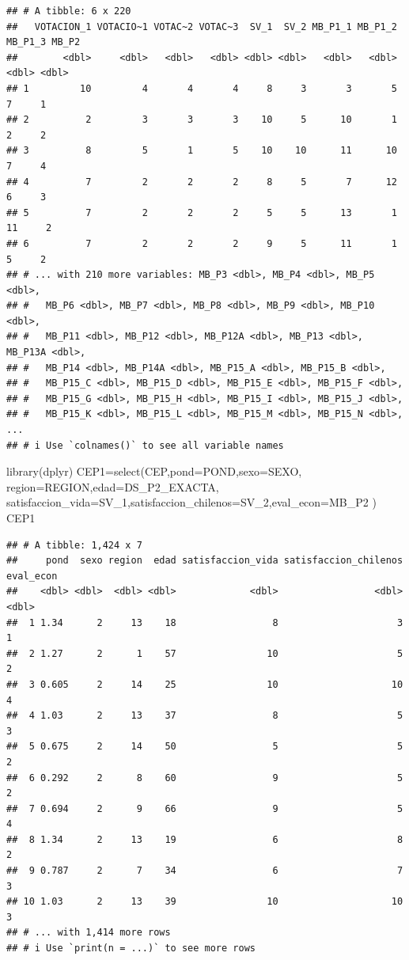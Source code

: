 \documentclass[
]{article}
\newenvironment{Shaded}{\begin{snugshade}}{\end{snugshade}}
\newcommand{\AttributeTok}[1]{\textcolor[rgb]{0.77,0.63,0.00}{#1}}
\newcommand{\FunctionTok}[1]{\textcolor[rgb]{0.00,0.00,0.00}{#1}}
\newcommand{\NormalTok}[1]{#1}
\newcommand{\OtherTok}[1]{\textcolor[rgb]{0.56,0.35,0.01}{#1}}
\begin{document}
\begin{verbatim}
## # A tibble: 6 x 220
##   VOTACION_1 VOTACIO~1 VOTAC~2 VOTAC~3  SV_1  SV_2 MB_P1_1 MB_P1_2 MB_P1_3 MB_P2
##        <dbl>     <dbl>   <dbl>   <dbl> <dbl> <dbl>   <dbl>   <dbl>   <dbl> <dbl>
## 1         10         4       4       4     8     3       3       5       7     1
## 2          2         3       3       3    10     5      10       1       2     2
## 3          8         5       1       5    10    10      11      10       7     4
## 4          7         2       2       2     8     5       7      12       6     3
## 5          7         2       2       2     5     5      13       1      11     2
## 6          7         2       2       2     9     5      11       1       5     2
## # ... with 210 more variables: MB_P3 <dbl>, MB_P4 <dbl>, MB_P5 <dbl>,
## #   MB_P6 <dbl>, MB_P7 <dbl>, MB_P8 <dbl>, MB_P9 <dbl>, MB_P10 <dbl>,
## #   MB_P11 <dbl>, MB_P12 <dbl>, MB_P12A <dbl>, MB_P13 <dbl>, MB_P13A <dbl>,
## #   MB_P14 <dbl>, MB_P14A <dbl>, MB_P15_A <dbl>, MB_P15_B <dbl>,
## #   MB_P15_C <dbl>, MB_P15_D <dbl>, MB_P15_E <dbl>, MB_P15_F <dbl>,
## #   MB_P15_G <dbl>, MB_P15_H <dbl>, MB_P15_I <dbl>, MB_P15_J <dbl>,
## #   MB_P15_K <dbl>, MB_P15_L <dbl>, MB_P15_M <dbl>, MB_P15_N <dbl>, ...
## # i Use `colnames()` to see all variable names
\end{verbatim}

\begin{Shaded}
\begin{Highlighting}[]
\FunctionTok{library}\NormalTok{(dplyr)}
\NormalTok{CEP1}\OtherTok{=}\FunctionTok{select}\NormalTok{(CEP,}\AttributeTok{pond=}\NormalTok{POND,}\AttributeTok{sexo=}\NormalTok{SEXO,}
            \AttributeTok{region=}\NormalTok{REGION,}\AttributeTok{edad=}\NormalTok{DS\_P2\_EXACTA,}
           \AttributeTok{satisfaccion\_vida=}\NormalTok{SV\_1,}\AttributeTok{satisfaccion\_chilenos=}\NormalTok{SV\_2,}\AttributeTok{eval\_econ=}\NormalTok{MB\_P2 )}
\NormalTok{CEP1}
\end{Highlighting}
\end{Shaded}

\begin{verbatim}
## # A tibble: 1,424 x 7
##     pond  sexo region  edad satisfaccion_vida satisfaccion_chilenos eval_econ
##    <dbl> <dbl>  <dbl> <dbl>             <dbl>                 <dbl>     <dbl>
##  1 1.34      2     13    18                 8                     3         1
##  2 1.27      2      1    57                10                     5         2
##  3 0.605     2     14    25                10                    10         4
##  4 1.03      2     13    37                 8                     5         3
##  5 0.675     2     14    50                 5                     5         2
##  6 0.292     2      8    60                 9                     5         2
##  7 0.694     2      9    66                 9                     5         4
##  8 1.34      2     13    19                 6                     8         2
##  9 0.787     2      7    34                 6                     7         3
## 10 1.03      2     13    39                10                    10         3
## # ... with 1,414 more rows
## # i Use `print(n = ...)` to see more rows
\end{verbatim}
\end{document}
